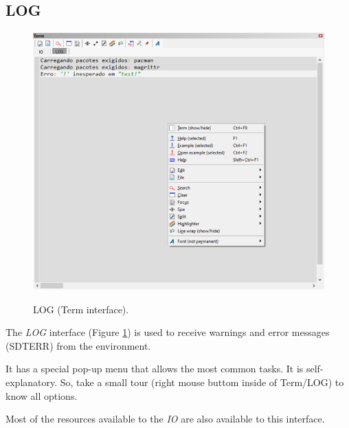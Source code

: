 \hypertarget{working_term_log}{}
\subsection{LOG}

 \begin{figure}[H]
  \includegraphics[scale=0.35]{./res/term_log.png}\\
  \caption{LOG (Term interface).}
  \label{fig:term_log}
\end{figure}

The \textit{LOG} interface
(Figure \ref{fig:term_log})
is used to receive warnings and error messages (SDTERR) from the \RR{} environment.

It has a special pop-up menu that allows the most common tasks. It is
self-explanatory. So, take a small tour (right mouse buttom inside of
Term/LOG) to know all options.

Most of the resources available to the \textit{IO} are also available to this
interface.
